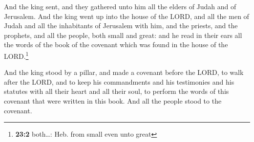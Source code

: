  And the king sent, and they gathered unto him all the
elders of Judah and of Jerusalem.  And the king went up
into the house of the LORD, and all the men of Judah and all the
inhabitants of Jerusalem with him, and the priests, and the prophets,
and all the people, both small and great: and he read in their ears all
the words of the book of the covenant which was found in the house of
the LORD.\footnote{\textbf{23:2} both\ldots: Heb. from small even unto
  great}

 And the king stood by a pillar, and made a covenant
before the LORD, to walk after the LORD, and to keep his commandments
and his testimonies and his statutes with all their heart and all their
soul, to perform the words of this covenant that were written in this
book. And all the people stood to the covenant.

